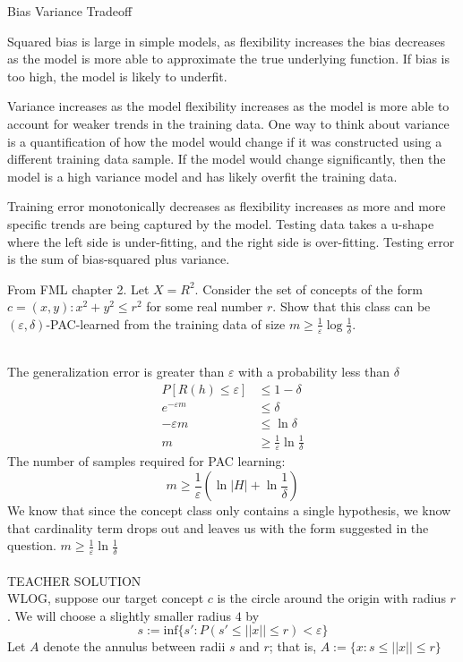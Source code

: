 \documentclass[draft]{exam} %
\renewcommand{\epsilon}{\varepsilon}
\theoremstyle{definition} \newtheorem*{defn}{Definition}
\begin{document}
\begin{questions}
\begin{solution}
\end{solution} %

\question Bias Variance Tradeoff
\begin{solution}
Squared bias is large in simple models, as flexibility
    increases the bias decreases as the model is more able to approximate
    the true underlying function. If bias is too high, the model is likely
    to underfit.

    Variance increases as the model flexibility increases as the model is
    more able to account for weaker trends in the training data. One way to
    think about variance is a quantification of how the model would change
    if it was constructed using a different training data sample. If the
    model would change significantly, then the model is a high variance
    model and has likely overfit the training data.

    Training error monotonically decreases as flexibility increases as more
    and more specific trends are being captured by the model. Testing
    data takes a u-shape where the left side is under-fitting, and the right
    side is over-fitting. Testing error is the sum of bias-squared plus
    variance.
\end{solution}

\question From FML chapter 2. Let $X = R^2$. Consider the set of concepts of the form $c = (x, y) : x^2 + y^2 \leq r^2$
for some real number $r$. Show that this class can be $(\epsilon , \delta)$-PAC-learned from the training data of size
$m \geq \frac{1}{\epsilon}\log\frac{1}{\delta}$.
\begin{solution} \\%
The generalization error is greater than $\epsilon$ with a probability less than $\delta$
\begin{align*}
P[R(h)\leq \epsilon] & \leq 1 - \delta \\
e^{-\epsilon m} & \leq \delta \\
-\epsilon m & \leq \ln \delta \\
m & \geq \frac{1}{\epsilon}\ln\frac{1}{\delta}
\end{align*}
The number of samples required for PAC learning:\\
$$m \geq \frac{1}{\epsilon} (\ln |H| + \ln\frac{1}{\delta})$$
We know that since the concept class only contains a single hypothesis, we know that cardinality term drops out and leaves us with the form suggested in the question. $m \geq \frac{1}{\epsilon}\ln\frac{1}{\delta}$
\\\\
TEACHER SOLUTION\\
  WLOG, suppose our target concept $c$ is the circle around the origin with
  radius $r$. We will choose a slightly smaller radius $4$ by
  \[ s := \text{inf}\{s': P(s'\leq ||x|| \leq r) < \epsilon\} \]
  Let $A$ denote the annulus between radii $s$ and $r$; that is, $A := \{ x:
  s \leq ||x|| \leq r\}$


\end{solution}
\end{questions}
\end{document}
